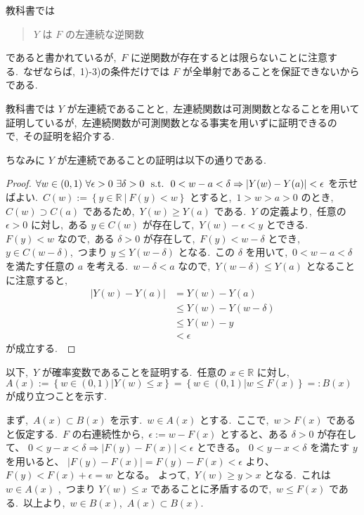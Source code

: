 \documentclass[a4j,11pt]{jarticle}
\theoremstyle{definition}
\begin{document}
教科書では
\begin{quote}
$Y$
は
$F$
の左連続な逆関数
\end{quote}
であると書かれているが,\ 
$F$
に逆関数が存在するとは限らないことに注意する.\ 
なぜならば,\ 1)-3)の条件だけでは
$F$
が全単射であることを保証できないからである.\ 

教科書では
$Y$
が左連続であることと,\ 左連続関数は可測関数となることを用いて証明しているが,\ 左連続関数が可測関数となる事実を用いずに証明できるので,\ その証明を紹介する.\ 

ちなみに
$Y$
が左連続であることの証明は以下の通りである.\ 
\begin{proof}
  $\forall w \in (0,1) \ \forall \epsilon >0 \ \exists \delta > 0  \ \  {\rm s.t.}\ \ 0 < w-a <\delta \Rightarrow |Y(w)-Y(a)| < \epsilon$
  を示せばよい.\ 
  $C(w) := \left\{y\in\mathbb{R}\ |\ F(y)<w \right\}$
  とすると,\ 
  $1 > w > a > 0$
  のとき,\ 
  $C(w) \supset C(a)$
  であるため,\ 
  $Y(w) \geq Y(a)$
  である.\ 
  $Y$
  の定義より,\ 任意の
  $\epsilon > 0$
  に対し,\ ある
  $y \in C(w)$
  が存在して,\ 
  $Y(w) - \epsilon < y$
  とできる.\ 
  $F(y) < w$
  なので,\ ある
  $\delta > 0$
  が存在して,\ 
  $F(y) < w - \delta$
  とでき,\ 
  $y \in C(w-\delta)$,\ 
  つまり
  $y \leq Y(w-\delta)$
  となる.\ 
  この
  $\delta$
  を用いて,\ 
  $0 < w-a<\delta$
  を満たす任意の
  $a$
  を考える.\ 
  $w-\delta < a$
  なので,\ 
  $Y(w-\delta) \leq Y(a)$
  となることに注意すると,\ 
  \begin{align}
    |Y(w)-Y(a)|
    & = Y(w) - Y(a) \\
    & \leq Y(w) - Y(w-\delta) \\
    & \leq Y(w) - y \\
    & < \epsilon
  \end{align}
  が成立する.\ 
\end{proof}

以下,\ 
$Y$
が確率変数であることを証明する.\ 
任意の
$x\in \mathbb{R}$
に対し,\ 
$A(x):=\left\{ w \in \left( 0,1\right) | Y(w) \leq x \right\} = \left\{ w\in \left( 0,1\right) | w\leq F(x) \right\}=:B(x)$
が成り立つことを示す.\ 

まず,\ 
$A(x) \subset B(x)$
を示す.\ 
$w \in A(x)$
とする.\ 
ここで,\ 
$w > F(x)$
であると仮定する.\ 
$F$
の右連続性から,\ 
$\epsilon := w - F(x)$
とすると、ある
$\delta > 0$
が存在して、
$0 < y - x < \delta \Rightarrow |F(y)-F(x)| < \epsilon$
とできる。
$0 < y - x < \delta$
を満たす
$y$
を用いると、
$|F(y)-F(x)| = F(y)-F(x) < \epsilon$
より、
$F(y) < F(x)+\epsilon = w$
となる。
よって,\ 
$Y(w) \geq y > x$
となる.\ 
これは
$w \in A(x)$
,\ つまり
$Y(w) \leq x$
であることに矛盾するので,\ 
$w \leq F(x)$
である.\ 
以上より,\ 
$w \in B(x)$,\ 
$A(x) \subset B(x)$.\ 
\end{document}
